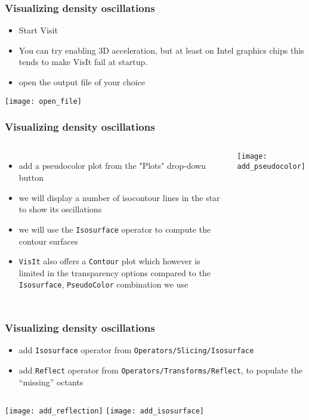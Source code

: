 \begin{frame}
\frametitle{Visualizing density oscillations}
\begin{itemize}
    \item Start Visit
    \item You can try enabling 3D acceleration, but at least on Intel graphics
	  chips this tends to make VisIt fail at startup.
    \item open the output file of your choice
\end{itemize}
\begin{center}
\texttt{[image: open\_file]}
\end{center}
\end{frame}

\begin{frame}
\frametitle{Visualizing density oscillations}
\begin{columns}
\column{60mm}
\begin{itemize}
\item add a pseudocolor plot from the "Plots" drop-down button
\item we will display a number of isocontour lines in the star to show its oscillations
\item we will use the \texttt{Isosurface} operator to compute the contour surfaces
\item \texttt{VisIt} also offers a \texttt{Contour} plot which however is limited in the transparency options compared to the \texttt{Isosurface}, \texttt{PseudoColor} combination we use
\end{itemize}
\column{60mm}
\texttt{[image: add\_pseudocolor]}
\end{columns}
\end{frame}

\begin{frame}
\frametitle{Visualizing density oscillations}
\begin{itemize}
\item add \texttt{Isosurface} operator from \texttt{Operators/Slicing/Isosurface}
\item add \texttt{Reflect} operator from \texttt{Operators/Transforms/Reflect}, to populate the ``missing'' octants
\end{itemize}
\begin{columns}
\column{60mm}
\texttt{[image: add\_reflection]}
\column{60mm}
\texttt{[image: add\_isosurface]}
\end{columns}
\end{frame}

